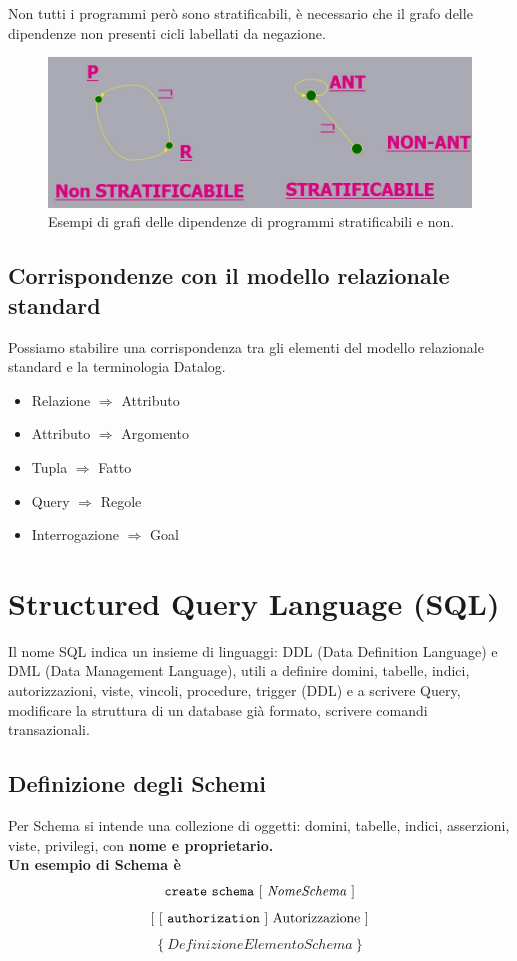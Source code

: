 \documentclass[11pt]{article} %
\begin{document}
Non tutti i programmi però sono stratificabili, è necessario che il grafo delle dipendenze non presenti cicli labellati da negazione.
\begin{figure}[htbp]
		\includegraphics{EsempioProgrammaStratificabile.jpg}
	\caption{Esempi di grafi delle dipendenze di programmi stratificabili e non.}
\end{figure}
\newpage
\subsection{Corrispondenze con il modello relazionale standard}
Possiamo stabilire una corrispondenza tra gli elementi del modello relazionale standard e la terminologia Datalog.\\
\begin{itemize}
\item Relazione $\Rightarrow$ Attributo
\item Attributo $\Rightarrow$ Argomento
\item Tupla $\Rightarrow$ Fatto
\item Query $\Rightarrow$ Regole
\item Interrogazione $\Rightarrow$ Goal
\end{itemize}
\newpage
\section{Structured Query Language (SQL)}
Il nome SQL indica un insieme di linguaggi: DDL (Data Definition Language) e DML (Data Management Language), utili a definire domini, tabelle, indici, autorizzazioni, viste, vincoli, procedure, trigger (DDL) e a scrivere Query, modificare la struttura di un database già formato, scrivere comandi transazionali.
\subsection{Definizione degli Schemi}
Per Schema si intende una collezione di oggetti: domini, tabelle, indici, asserzioni, viste, privilegi, con \bf nome e proprietario\rm.\\ Un esempio di Schema è $$ \tt create\ schema \rm\ [\ \it Nome Schema \rm\ ] $$ $$[\ [\ \tt authorization\rm\ ]\ Autorizzazione\ ]$$ $$\{\ DefinizioneElementoSchema\ \}$$
\end{document}

